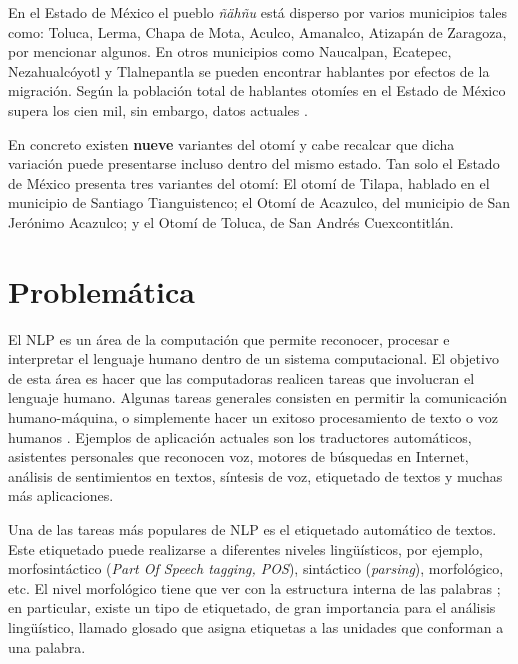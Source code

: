 \documentclass[letterpaper,12pt,oneside]{scrbook}
\theoremstyle{definition}
\begin{document}
	
	En el Estado de México el pueblo \textit{ñähñu} está disperso por varios municipios tales como: Toluca, Lerma, Chapa de Mota, Aculco, Amanalco, Atizapán de Zaragoza, por mencionar algunos. En otros municipios como Naucalpan, Ecatepec, Nezahualcóyotl y Tlalnepantla se pueden encontrar hablantes por efectos de la migración. Según \citet{barrientos2004otomies} la población total de hablantes otomíes en el Estado de México supera los cien mil, sin embargo, datos actuales .

	
	En concreto existen \textbf{nueve} variantes del otomí y cabe recalcar que dicha variación puede presentarse incluso dentro del mismo estado. Tan solo el Estado de México presenta tres variantes del otomí: El otomí de Tilapa, hablado en el municipio de Santiago Tianguistenco; el Otomí de Acazulco, del municipio de San Jerónimo Acazulco; y el Otomí de Toluca, de San Andrés Cuexcontitlán.

	
	\section{Problemática}

	

	El NLP es un área de la computación que permite reconocer, procesar e interpretar el lenguaje humano dentro de un sistema computacional. El objetivo de esta área es hacer que las computadoras realicen tareas que involucran el lenguaje humano. Algunas tareas generales consisten en permitir la comunicación humano-máquina, o simplemente hacer un exitoso procesamiento de texto o voz humanos \citep{jurafsky2008speech}. Ejemplos de aplicación actuales son los traductores automáticos, asistentes personales que reconocen voz, motores de búsquedas en Internet, análisis de sentimientos en textos,  síntesis de voz, etiquetado de textos y muchas más aplicaciones.

	

	Una de las tareas más populares de NLP es el etiquetado automático de textos. Este etiquetado puede realizarse a diferentes niveles lingüísticos, por ejemplo, morfosintáctico (\textit{Part Of Speech tagging, POS}), sintáctico (\textit{parsing}), morfológico, etc.  El nivel morfológico tiene que ver con la estructura interna de las palabras \citep{haspelmath2013understanding}; en particular, existe un tipo de etiquetado, de gran importancia para el análisis lingüístico, llamado glosado que asigna etiquetas a las unidades que conforman a una palabra. 
\end{document}
